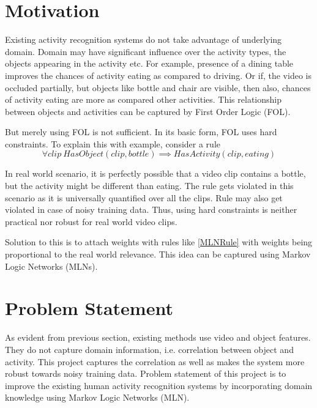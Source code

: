 \section{Motivation}
Existing activity recognition systems do not take advantage of underlying domain.
Domain may have significant influence over the activity types, the objects appearing
in the activity etc. For example, presence of a dining table improves the chances
of activity eating as compared to driving. Or if, the video is occluded partially,
but objects like bottle and chair are visible, then also, chances of activity eating
are more as compared other activities. This relationship between objects and activities
can be captured by First Order Logic (FOL).

But merely using FOL is not sufficient. In its basic form, FOL uses hard constraints.
To explain this with example, consider a rule
\begin{equation}
	\label{MLNRule}
	\forall clip ~ HasObject( clip, bottle ) \implies HasActivity( clip, eating )
\end{equation}

In real world scenario, it is perfectly possible that a video clip contains a bottle,
but the activity might be different than eating. 
The rule gets violated in this scenario as it is universally quantified over all the clips. 
Rule may also get violated in case of noisy training data. 
Thus, using hard constraints is neither practical nor robust for real world video clips. 

Solution to this is to attach weights with rules like \eqref{MLNRule} with weights being proportional to the real world relevance.
This idea can be captured using Markov Logic Networks (MLNs).








\section{Problem Statement}
As evident from previous section, existing methods use video and object features. They do not capture domain information, i.e. correlation between object and activity. 
This project captures the correlation as well as makes the system more robust towards noisy training data.
Problem statement of this project is to improve the existing human activity recognition systems
by incorporating domain knowledge using Markov Logic Networks (MLN).








